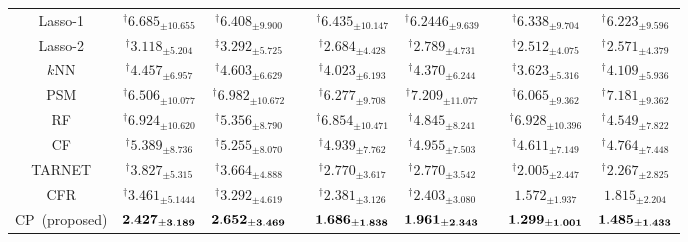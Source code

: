 \begin{table}[tbp]
{\begin{tabular} {ccccccccc }
Lasso-1   &        $^\dagger6.685_{\pm{10.655}}$       &       $^\dagger6.408_{\pm{9.900}}$         & \multicolumn{1}{l}{} &        $^\dagger6.435_{\pm{10.147}}$       &  $^\dagger6.2446_{\pm{9.639}}$       &     &   $^\dagger6.338_{\pm{9.704}}$ &  $^\dagger6.223_{\pm{9.596}}$  \\[3pt]
Lasso-2   &        $^\dagger3.118_{\pm{5.204}}$       &       $^\ddagger3.292_{\pm{5.725}}$         & \multicolumn{1}{l}{} &         $^\dagger2.684_{\pm{4.428}}$    &  $^\dagger2.789_{\pm{4.731}}$       &  &   $^\dagger2.512_{\pm{4.075}}$& $^\dagger2.571_{\pm{4.379}}$      \\[3pt]
\cmidrule{1-9}
\multicolumn{1}{c}{$k$NN} &        $^\dagger4.457_{\pm{6.957}}$  &  $^\dagger4.603_{\pm{6.629}}$         & \multicolumn{1}{l}{} &      $^\dagger4.023_{\pm{6.193}}$     &    $^\dagger4.370_{\pm{6.244}}$     &  &   $^\dagger3.623_{\pm{5.316}}$ & $^\dagger4.109_{\pm{5.936}}$      \\[3pt]
\multicolumn{1}{c}{PSM}    &        $^\dagger6.506_{\pm{10.077}}$       &       $^\dagger6.982_{\pm{10.672}}$         & \multicolumn{1}{l}{} &   $^\dagger6.277_{\pm{9.708}}$     &    $^\dagger7.209_{\pm{11.077}}$    &  &   $^\dagger6.065_{\pm{9.362}}$ & $^\dagger7.181_{\pm{9.362}}$      \\[3pt]
\cmidrule{1-9}
\multicolumn{1}{c}{RF}    &        $^\dagger6.924_{\pm{10.620}}$       &       $^\dagger5.356_{\pm{8.790}}$         & \multicolumn{1}{l}{} &   $^\dagger6.854_{\pm{10.471}}$      &    $^\dagger4.845_{\pm{8.241}}$     &  &   $ ^\dagger6.928_{\pm{10.396}}$ & $^\dagger4.549_{\pm{7.822}}$\\[3pt]
\multicolumn{1}{c}{CF}    &        $^\dagger5.389_{\pm{8.736}}$       &       $^\dagger5.255_{\pm{8.070}}$         & \multicolumn{1}{l}{} &   $^\dagger4.939_{\pm{7.762}}$      &    $^\dagger4.955_{\pm{7.503}}$   &  &   $^\dagger4.611_{\pm{7.149}}$  &  $^\dagger4.764_{\pm{7.448}}$\\[3pt]
\cmidrule{1-9}
\multicolumn{1}{c}{TARNET}    &        $^\dagger3.827_{\pm{5.315}}$       &       $^\dagger3.664_{\pm{4.888}}$         & \multicolumn{1}{l}{} &   $^\dagger2.770_{\pm{3.617}}$  &    $^\dagger2.770_{\pm{3.542}}$   &     &   $^\dagger2.005_{\pm{2.447}}$& $^\dagger2.267_{\pm{2.825}}$      \\[3pt]
\multicolumn{1}{c}{CFR}    &        $^\dagger3.461_{\pm{5.1444}}$       &       $^\dagger3.292_{\pm{4.619}}$         & \multicolumn{1}{l}{} &  $^\dagger2.381_{\pm{3.126}}$ &    $^\dagger2.403_{\pm{3.080}}$      &  &   $1.572_{\pm{1.937}}$ & $1.815_{\pm{2.204}}	$   	 \\[3pt]
\cmidrule{1-9}
CP~(proposed) &       $\bf 2.427_{\pm{3.189}}$ & $\bf 2.652_{\pm{3.469}}$        & \multicolumn{1}{l}{} &     $\bf 1.686_{\pm{1.838}}$          & $\bf 1.961_{\pm{2.343}}$       &  &   $\bf 1.299_{\pm{1.001}} $& $\bf 1.485_{\pm{1.433}}$      \\[3pt]
\bottomrule[2pt]
    \end{tabular}
    }
\end{table}

